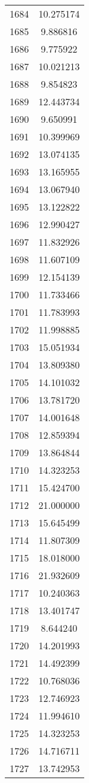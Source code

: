 \documentclass[12pt]{article}
\begin{document}
\begin{longtable}{@{}cc@{}}
1684 & 10.275174 \\
1685 & 9.886816 \\
1686 & 9.775922 \\
1687 & 10.021213 \\
1688 & 9.854823 \\
1689 & 12.443734 \\
1690 & 9.650991 \\
1691 & 10.399969 \\
1692 & 13.074135 \\
1693 & 13.165955 \\
1694 & 13.067940 \\
1695 & 13.122822 \\
1696 & 12.990427 \\
1697 & 11.832926 \\
1698 & 11.607109 \\
1699 & 12.154139 \\
1700 & 11.733466 \\
1701 & 11.783993 \\
1702 & 11.998885 \\
1703 & 15.051934 \\
1704 & 13.809380 \\
1705 & 14.101032 \\
1706 & 13.781720 \\
1707 & 14.001648 \\
1708 & 12.859394 \\
1709 & 13.864844 \\
1710 & 14.323253 \\
1711 & 15.424700 \\
1712 & 21.000000 \\
1713 & 15.645499 \\
1714 & 11.807309 \\
1715 & 18.018000 \\
1716 & 21.932609 \\
1717 & 10.240363 \\
1718 & 13.401747 \\
1719 & 8.644240 \\
1720 & 14.201993 \\
1721 & 14.492399 \\
1722 & 10.768036 \\
1723 & 12.746923 \\
1724 & 11.994610 \\
1725 & 14.323253 \\
1726 & 14.716711 \\
1727 & 13.742953 \\

\end{longtable}
\end{document}
